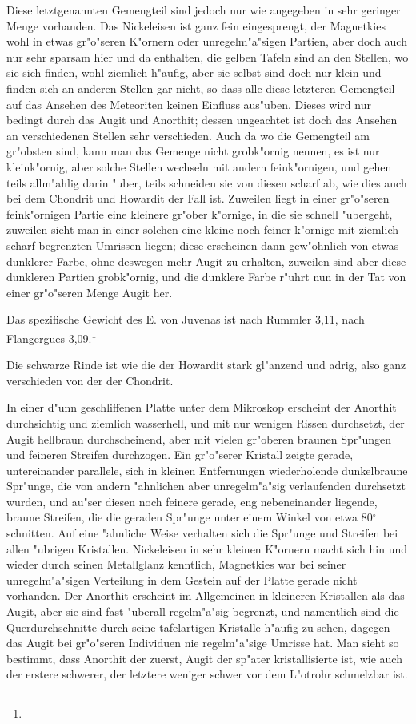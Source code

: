 \documentclass[a4paper, 11pt, oneside]{article}
\begin{document}
Diese letztgenannten Gemengteil sind jedoch nur wie angegeben in sehr geringer Menge vorhanden. Das Nickeleisen ist ganz fein eingesprengt, der Magnetkies wohl in etwas gr"o"seren K"ornern oder unregelm"a"sigen Partien, aber doch auch nur sehr sparsam hier und da enthalten, die gelben Tafeln sind an den Stellen, wo sie sich finden, wohl ziemlich h"aufig, aber sie selbst sind doch nur klein und finden sich an anderen Stellen gar nicht, so dass alle diese letzteren Gemengteil auf das Ansehen des Meteoriten keinen Einfluss aus"uben. Dieses wird nur bedingt durch das Augit und Anorthit; dessen ungeachtet ist doch das Ansehen an verschiedenen Stellen sehr verschieden. Auch da wo die Gemengteil am gr"obsten sind, kann man das Gemenge nicht grobk"ornig nennen, es ist nur kleink"ornig, aber solche Stellen wechseln mit andern feink"ornigen, und gehen teils allm"ahlig darin "uber, teils schneiden sie von diesen scharf ab, wie dies auch bei dem Chondrit und Howardit der Fall ist. Zuweilen liegt in einer gr"o"seren feink"ornigen Partie eine kleinere gr"ober k"ornige, in die sie schnell "ubergeht, zuweilen sieht man in einer solchen eine kleine noch feiner k"ornige mit ziemlich scharf begrenzten Umrissen liegen; diese erscheinen dann gew"ohnlich von etwas dunklerer Farbe, ohne deswegen mehr Augit zu erhalten, zuweilen sind aber diese dunkleren Partien grobk"ornig, und die dunklere Farbe r"uhrt nun in der Tat von einer gr"o"seren Menge Augit her.

Das spezifische Gewicht des E. von Juvenas ist nach Rummler 3,11, nach Flangergues 3,09.\footnote{}

Die schwarze Rinde ist wie die der Howardit stark gl"anzend und adrig, also ganz verschieden von der der Chondrit.

In einer d"unn geschliffenen Platte unter dem Mikroskop erscheint der Anorthit durchsichtig und ziemlich wasserhell, und mit nur wenigen Rissen durchsetzt, der Augit hellbraun durchscheinend, aber mit vielen gr"oberen braunen Spr"ungen und feineren Streifen durchzogen. Ein gr"o"serer Kristall zeigte gerade, untereinander parallele, sich in kleinen Entfernungen wiederholende dunkelbraune Spr"unge, die von andern "ahnlichen aber unregelm"a"sig verlaufenden durchsetzt wurden, und au"ser diesen noch feinere gerade, eng nebeneinander liegende, braune Streifen, die die geraden Spr"unge unter einem Winkel von etwa 80$^{\circ}$ schnitten. Auf eine "ahnliche Weise verhalten sich die Spr"unge und Streifen bei allen "ubrigen Kristallen. Nickeleisen in sehr kleinen K"ornern macht sich hin und wieder durch seinen Metallglanz kenntlich, Magnetkies war bei seiner unregelm"a"sigen Verteilung in dem Gestein auf der Platte gerade nicht vorhanden. Der Anorthit erscheint im Allgemeinen in kleineren Kristallen als das Augit, aber sie sind fast "uberall regelm"a"sig begrenzt, und namentlich sind die Querdurchschnitte durch seine tafelartigen Kristalle h"aufig zu sehen, dagegen das Augit bei gr"o"seren Individuen nie regelm"a"sige Umrisse hat. Man sieht so bestimmt, dass Anorthit der zuerst, Augit der sp"ater kristallisierte ist, wie auch der erstere schwerer, der letztere weniger schwer vor dem L"otrohr schmelzbar ist.
\end{document}
